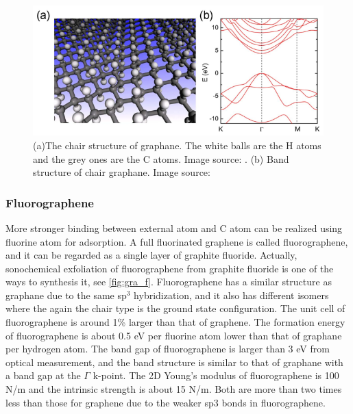 \begin{figure}[htbp!] 
\centering  
\includegraphics[width=1\textwidth]{graphane.eps}
\caption[Atomic and electronic structure of graphane]{(a)The chair structure of graphane. The white balls are the H atoms and the grey ones are the C atoms. Image source: \cite{Sofo2007}. (b) Band structure of chair graphane. Image source: \cite{leenaerts2010}}  
\label{fig:gra_h}
\end{figure} 

\subsubsection{Fluorographene}

More stronger binding between external atom and C atom can be realized using fluorine atom for adsorption. A full fluorinated graphene is called fluorographene, and it can be regarded as a single layer of graphite fluoride. Actually, sonochemical exfoliation of fluorographene from graphite fluoride is one of the ways to synthesis it, see \autoref{fig:gra_f}\cite{Zhu2013}. Fluorographene has a similar structure as graphane due to the same sp$^3$ hybridization, and it also has different isomers where the again the chair type is the ground state configuration\cite{samarakoon2011}. The unit cell of fluorographene is around 1\% larger than that of graphene\cite{nair2010}. The formation energy of fluorographene is about 0.5 eV per fluorine atom lower than that of graphane per hydrogen atom\cite{Jeon2011}. The band gap of fluorographene is larger than 3 eV from optical measurement\cite{nair2010,Jeon2011}, and the band structure is similar to that of graphane with a band gap at the $\Gamma$ k-point. The 2D Young's modulus of fluorographene is 100 \si{N/m} and the intrinsic strength is about 15 \si{N/m}. Both are more than two times less than those for graphene due to the weaker sp$3$ bonds in fluorographene\cite{nair2010}.

